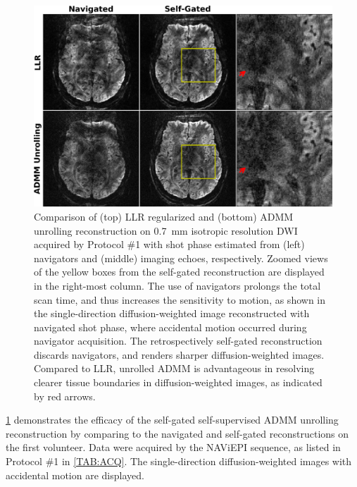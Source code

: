 \documentclass[journal,twoside,web]{ieeecolor}
\begin{document}
	\begin{figure}
		\begin{minipage}[c]{0.75\textwidth}
			\includegraphics[width=\textwidth]{../figures/fig3.png}
		\end{minipage}\hfill
		\begin{minipage}[c]{0.23\textwidth}
			\caption{Comparison of (top) LLR regularized 
				and (bottom) ADMM unrolling
				reconstruction on 0.7~mm isotropic resolution DWI
				acquired by Protocol \#1
				with shot phase estimated from
				(left) navigators and (middle) imaging echoes, respectively.
				Zoomed views of the yellow boxes from the self-gated reconstruction
				are displayed in the right-most column.
				The use of navigators prolongs the total scan time,
				and thus increases the sensitivity to motion,
				as shown in the single-direction diffusion-weighted image 
				reconstructed with navigated shot phase, 
				where accidental motion occurred during navigator acquisition.
				The retrospectively self-gated reconstruction discards navigators,
				and renders sharper diffusion-weighted images. 
				Compared to LLR, unrolled ADMM is advantageous
				in resolving clearer tissue boundaries 
				in diffusion-weighted images,
				as indicated by red arrows.}
				\label{FIG:MOTION_RETRO_TRA}
		\end{minipage}
	\end{figure}

	\cref{FIG:MOTION_RETRO_TRA} demonstrates
	the efficacy of the self-gated self-supervised ADMM unrolling reconstruction
	by comparing to the navigated and self-gated reconstructions 
	on the first volunteer.
	Data were acquired by the NAViEPI sequence, 
	as listed in Protocol \#1 in \cref{TAB:ACQ}.
	The single-direction diffusion-weighted images with accidental motion
	are displayed.
\end{document}
